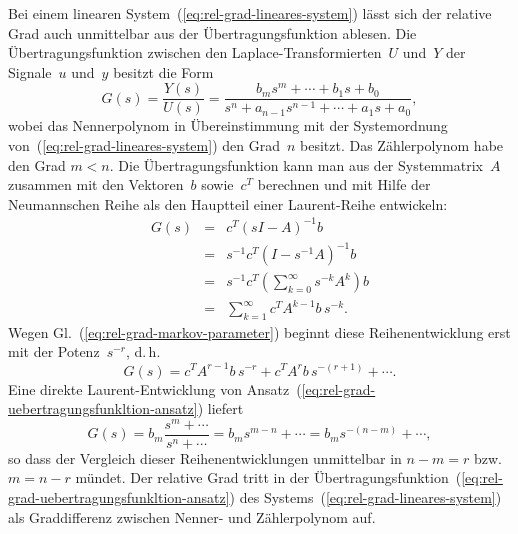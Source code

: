 \begin{remark}
\label{rem:rel-grad-Uebertragungsfunktion}Bei einem linearen System~(\ref{eq:rel-grad-lineares-system})
lässt sich der relative Grad auch unmittelbar aus der Übertragungsfunktion
ablesen. Die Übertragungsfunktion zwischen den Laplace-Transformierten~$U$
und~$Y$ der Signale~$u$ und~$y$ besitzt die Form
\begin{equation}
G(s)=\frac{Y(s)}{U(s)}=\frac{b_{m}s^{m}+\cdots+b_{1}s+b_{0}}{s^{n}+a_{n-1}s^{n-1}+\cdots+a_{1}s+a_{0}},\label{eq:rel-grad-uebertragungsfunkltion-ansatz}
\end{equation}
wobei das Nennerpolynom in Übereinstimmung mit der Systemordnung von~(\ref{eq:rel-grad-lineares-system})
den Grad~$n$ besitzt. Das Zählerpolynom habe den Grad $m<n$. Die
Übertragungsfunktion kann man aus der Systemmatrix~$A$ zusammen
mit den Vektoren~$b$ sowie~$c^{T}$ berechnen und mit Hilfe der
Neumannschen Reihe als den Hauptteil einer
Laurent-Reihe entwickeln: 
\begin{eqnarray*}
G(s) & = & c^{T}\left(sI-A\right)^{-1}b\\
 & = & s^{-1}c^{T}\left(I-s^{-1}A\right)^{-1}b\\
 & = & s^{-1}c^{T}\left(\sum_{k=0}^{\infty}s^{-k}A^{k}\right)b\\
 & = & \sum_{k=1}^{\infty}c^{T}A^{k-1}b\,s^{-k}.
\end{eqnarray*}
Wegen Gl.~(\ref{eq:rel-grad-markov-parameter}) beginnt diese Reihenentwicklung
erst mit der Potenz~$s^{-r}$, d.\,h.
\[
G(s)=c^{T}A^{r-1}b\,s^{-r}+c^{T}A^{r}b\,s^{-(r+1)}+\cdots.
\]
 Eine direkte Laurent-Entwicklung von Ansatz~(\ref{eq:rel-grad-uebertragungsfunkltion-ansatz})
liefert
\[
G(s)=b_{m}\frac{s^{m}+\cdots}{s^{n}+\cdots}=b_{m}s^{m-n}+\cdots=b_{m}s^{-(n-m)}+\cdots,
\]
so dass der Vergleich dieser Reihenentwicklungen unmittelbar in $n-m=r$
bzw. $m=n-r$ mündet. Der relative Grad tritt in der Übertragungsfunktion~(\ref{eq:rel-grad-uebertragungsfunkltion-ansatz})
des Systems~(\ref{eq:rel-grad-lineares-system}) als Graddifferenz
zwischen \hbox{Nenner-} und Zähler\-polynom auf.
\end{remark}

